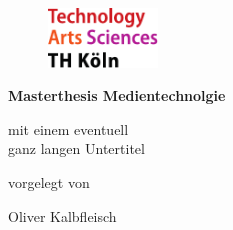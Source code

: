 \begin{titlepage}

\begin{center}

\begin{figure}[!ht]
		\includegraphics[width=0.26\textwidth]{images/THlogoheader.pdf}
\end{figure}

\vspace{0.4cm}

\begin{rmfamily}
\begin{huge}
\textbf{Masterthesis Medientechnolgie}\\	
\end{huge}
\vspace{0.5cm}
\begin{LARGE}
mit einem eventuell\\ganz langen Untertitel\\
\end{LARGE}
\end{rmfamily}

\vspace{0.8cm}



\begin{large}
vorgelegt von\\ 
\vspace{0.3cm}
\begin{LARGE}
Oliver Kalbfleisch \\
\end{LARGE}
\end{large}


\end{center}
\end{titlepage}
